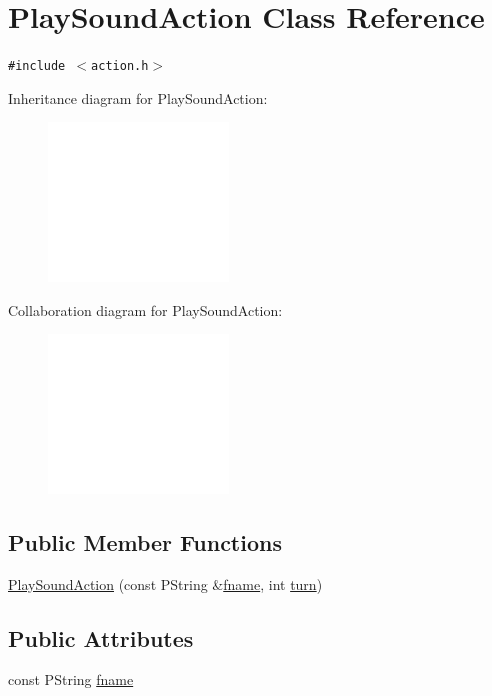 \hypertarget{classPlaySoundAction}{
\section{PlaySoundAction Class Reference}
\label{classPlaySoundAction}
}
{\tt \#include $<$action.h$>$}

Inheritance diagram for PlaySoundAction:\nopagebreak
\begin{figure}[H]
\begin{center}
\leavevmode
\includegraphics[width=136pt]{classPlaySoundAction__inherit__graph}
\end{center}
\end{figure}
Collaboration diagram for PlaySoundAction:\nopagebreak
\begin{figure}[H]
\begin{center}
\leavevmode
\includegraphics[width=136pt]{classPlaySoundAction__coll__graph}
\end{center}
\end{figure}
\subsection*{Public Member Functions}
\begin{CompactItemize}
\item 
\hyperlink{classPlaySoundAction_52a859c9276e8b94fc49dab724791ef2}{PlaySoundAction} (const PString \&\hyperlink{classPlaySoundAction_a79fe8c0c31676fff2718ff9b5fe031c}{fname}, int \hyperlink{classAction_51e5d56a6aa4a037e90df19587a225c7}{turn})
\end{CompactItemize}
\subsection*{Public Attributes}
\begin{CompactItemize}
\item 
const PString \hyperlink{classPlaySoundAction_a79fe8c0c31676fff2718ff9b5fe031c}{fname}
\end{CompactItemize}


